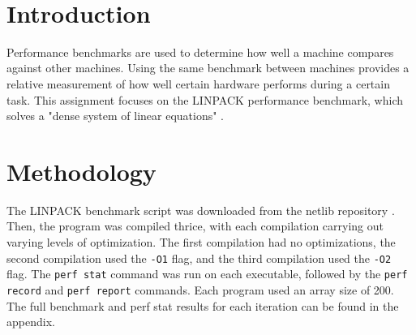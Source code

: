 \documentclass[twocolumn]{article}
\newcommand{\cc}[1]{\texttt{#1}}
\begin{document}
\

{\newpage}
\twocolumn

\maketitle        


\section{Introduction}

Performance benchmarks are used to determine how well a machine compares against other machines. Using the same benchmark between machines provides a relative measurement of how well certain hardware performs during a certain task. This assignment focuses on the LINPACK performance benchmark, which solves a "dense system of linear equations" \cite{top500}. 

\section{Methodology}

The LINPACK benchmark script was downloaded from the netlib repository \cite{netlib}. Then, the program was compiled thrice, with each compilation carrying out varying levels of optimization. The first compilation had no optimizations, the second compilation used the \cc{-O1} flag, and the third compilation used the \cc{-O2} flag. The \cc{perf stat} command was run on each executable, followed by the \cc{perf record} and \cc{perf report} commands. Each program used an array size of 200.\\

The full benchmark and perf stat results for each iteration can be found in the appendix.\\
\end{document}
